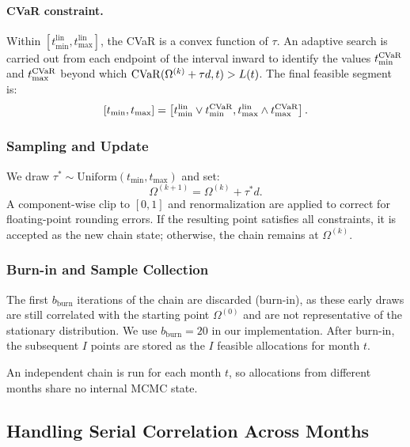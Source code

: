 \paragraph{CVaR constraint.}
Within $[t_{\min}^{\mathrm{lin}},t_{\max}^{\mathrm{lin}}]$, the CVaR is a convex function of $\tau$. An adaptive search is carried out from each endpoint of the interval inward to identify the values $t_{\min}^{\mathrm{CVaR}}$ and $t_{\max}^{\mathrm{CVaR}}$ beyond which $\mathrm{CVaR}(\Omega^{(k)}+\tau d,t)>L(t)$. The final feasible segment is:
\begin{equation}
\left[t_{\min},t_{\max}\right]
=
\left[
t_{\min}^{\mathrm{lin}} \vee t_{\min}^{\mathrm{CVaR}},
t_{\max}^{\mathrm{lin}} \wedge t_{\max}^{\mathrm{CVaR}}
\right].
\end{equation}

\subsubsection{Sampling and Update}

We draw $\tau^{*}\sim\mathrm{Uniform}(t_{\min},t_{\max})$ and set:
\begin{equation}
\Omega^{(k+1)}=\Omega^{(k)}+\tau^{*}d.
\end{equation}
A component-wise clip to $[0,1]$ and renormalization are applied to correct for floating-point rounding errors. If the resulting point satisfies all constraints, it is accepted as the new chain state; otherwise, the chain remains at $\Omega^{(k)}$.

\subsubsection{Burn-in and Sample Collection}

The first $b_{\mathrm{burn}}$ iterations of the chain are discarded (burn-in), as these early draws are still correlated with the starting point $\Omega^{(0)}$ and are not representative of the stationary distribution. We use $b_{\mathrm{burn}}=20$ in our implementation. After burn-in, the subsequent $I$ points are stored as the $I$ feasible allocations for month $t$.

An independent chain is run for each month $t$, so allocations from different months share no internal MCMC state.

\subsection{Handling Serial Correlation Across Months}


